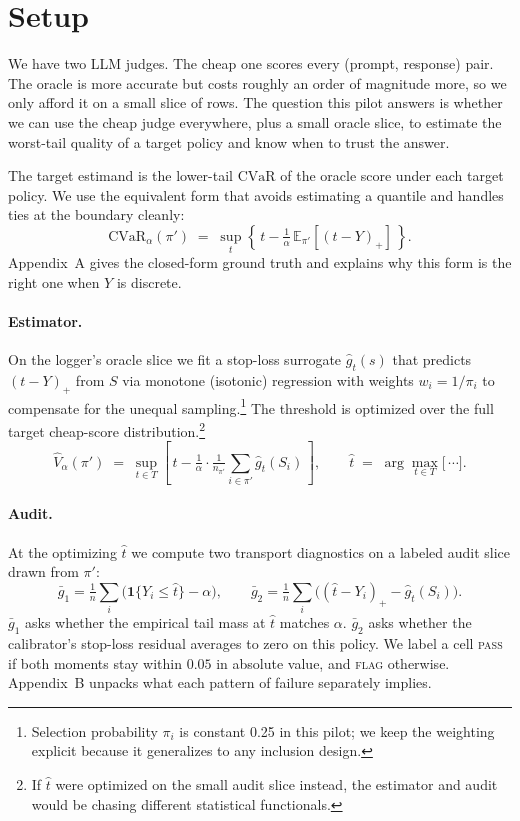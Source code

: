 \documentclass[11pt]{article}
\newcommand{\E}{\mathbb{E}}
\newcommand{\indicator}[1]{\mathbf{1}\{#1\}}
\newcommand{\ghat}{\widehat{g}}
\newcommand{\that}{\widehat{t}}
\newcommand{\Vhat}{\widehat{V}}
\newcommand{\CVaR}{\mathrm{CVaR}}
\begin{document}
\section{Setup}

We have two LLM judges. The cheap one scores every (prompt, response)
pair. The oracle is more accurate but costs roughly an order of
magnitude more, so we only afford it on a small slice of rows. The
question this pilot answers is whether we can use the cheap judge
everywhere, plus a small oracle slice, to estimate the worst-tail
quality of a target policy and know when to trust the answer.

The target estimand is the lower-tail $\CVaR$ of the oracle score under
each target policy. We use the equivalent form that avoids estimating a
quantile and handles ties at the boundary cleanly:
\begin{equation}
\CVaR_\alpha(\pi') \;=\; \sup_t \left\{\, t - \tfrac{1}{\alpha}\,\E_{\pi'}\!\left[(t - Y)_+\right] \,\right\}.
\label{eq:cvar}
\end{equation}
Appendix~A gives the closed-form ground truth and explains why this
form is the right one when $Y$ is discrete.

\paragraph{Estimator.}
On the logger's oracle slice we fit a stop-loss surrogate
$\ghat_t(s)$ that predicts $(t - Y)_+$ from $S$ via monotone (isotonic)
regression with weights $w_i = 1/\pi_i$ to compensate for the unequal
sampling.\footnote{Selection probability $\pi_i$ is constant 0.25 in
this pilot; we keep the weighting explicit because it generalizes to
any inclusion design.} The threshold is optimized over the full
target cheap-score distribution.\footnote{If $\that$ were optimized on
the small audit slice instead, the estimator and audit would be
chasing different statistical functionals.}
\begin{equation}
\Vhat_\alpha(\pi') \;=\; \sup_{t \in T} \left[\, t - \tfrac{1}{\alpha} \cdot
\tfrac{1}{n_{\pi'}}\sum_{i \in \pi'} \ghat_t(S_i) \,\right],
\qquad
\that \;=\; \arg\max_{t \in T}\big[\,\cdots\big].
\label{eq:est}
\end{equation}

\paragraph{Audit.}
At the optimizing $\that$ we compute two transport diagnostics on a
labeled audit slice drawn from $\pi'$:
\begin{equation}
\bar g_1 = \tfrac{1}{n}\sum_i \big(\indicator{Y_i \le \that} - \alpha\big),
\qquad
\bar g_2 = \tfrac{1}{n}\sum_i \big((\that - Y_i)_+ - \ghat_{\that}(S_i)\big).
\label{eq:audit}
\end{equation}
$\bar g_1$ asks whether the empirical tail mass at $\that$ matches
$\alpha$. $\bar g_2$ asks whether the calibrator's stop-loss residual
averages to zero on this policy. We label a cell \textsc{pass} if both
moments stay within $0.05$ in absolute value, and \textsc{flag}
otherwise. Appendix~B unpacks what each pattern of failure separately
implies.
\end{document}
